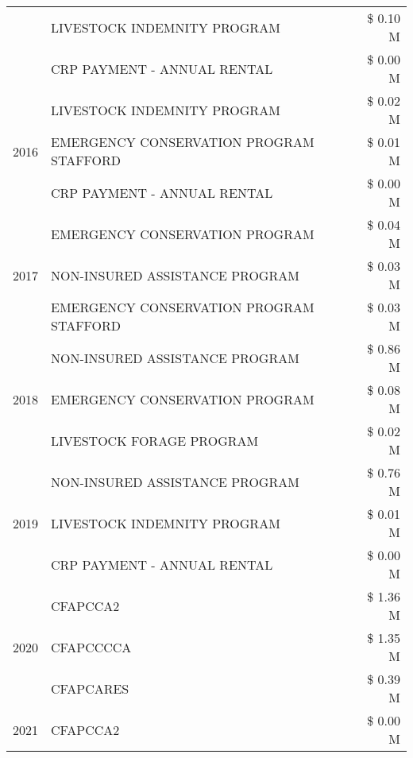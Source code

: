\begin{tabular}{llr}
 & LIVESTOCK INDEMNITY PROGRAM & \$ 0.10 M \\
 & CRP PAYMENT - ANNUAL RENTAL & \$ 0.00 M \\
\cline{1-3}
\multirow[t]{3}{*}{2016} & LIVESTOCK INDEMNITY PROGRAM                   & \$ 0.02 M \\
 & EMERGENCY CONSERVATION PROGRAM STAFFORD       & \$ 0.01 M \\
 & CRP PAYMENT - ANNUAL RENTAL                   & \$ 0.00 M \\
\cline{1-3}
\multirow[t]{3}{*}{2017} & EMERGENCY CONSERVATION PROGRAM & \$ 0.04 M \\
 & NON-INSURED ASSISTANCE PROGRAM & \$ 0.03 M \\
 & EMERGENCY CONSERVATION PROGRAM STAFFORD & \$ 0.03 M \\
\cline{1-3}
\multirow[t]{3}{*}{2018} & NON-INSURED ASSISTANCE PROGRAM & \$ 0.86 M \\
 & EMERGENCY CONSERVATION PROGRAM & \$ 0.08 M \\
 & LIVESTOCK FORAGE PROGRAM & \$ 0.02 M \\
\cline{1-3}
\multirow[t]{3}{*}{2019} & NON-INSURED ASSISTANCE PROGRAM & \$ 0.76 M \\
 & LIVESTOCK INDEMNITY PROGRAM & \$ 0.01 M \\
 & CRP PAYMENT - ANNUAL RENTAL & \$ 0.00 M \\
\cline{1-3}
\multirow[t]{3}{*}{2020} & CFAPCCA2 & \$ 1.36 M \\
 & CFAPCCCCA & \$ 1.35 M \\
 & CFAPCARES & \$ 0.39 M \\
\cline{1-3}
2021 & CFAPCCA2 & \$ 0.00 M \\
\cline{1-3}
\bottomrule
\end{tabular}
